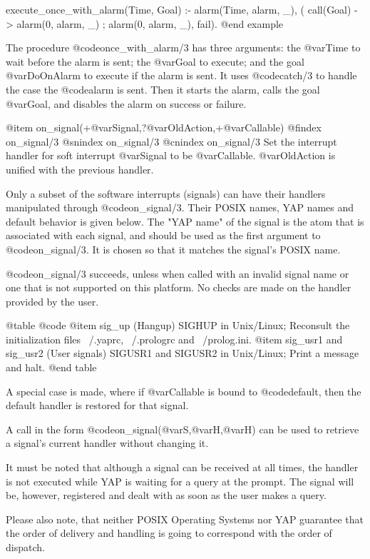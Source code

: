 {{{{{execute_once_with_alarm(Time, Goal) :-
        alarm(Time, alarm, _),
        ( call(Goal) -> alarm(0, alarm, _) ; alarm(0, alarm, _), fail).
@end example

The procedure @code{once_with_alarm/3} has three arguments:
the @var{Time} to wait before the alarm is
sent; the @var{Goal} to execute; and the goal @var{DoOnAlarm} to execute
if the alarm is sent. It uses @code{catch/3} to handle the case the
@code{alarm} is sent. Then it starts the alarm, calls the goal
@var{Goal}, and disables the alarm on success or failure.

@item on_signal(+@var{Signal},?@var{OldAction},+@var{Callable})
@findex on_signal/3
@snindex on_signal/3
@cnindex on_signal/3
Set the interrupt handler for soft interrupt @var{Signal} to be
@var{Callable}. @var{OldAction} is unified with the previous handler.

Only a subset of the software interrupts (signals) can have their
handlers manipulated through @code{on_signal/3}.
Their POSIX names, YAP names and default behavior is given below.
The "YAP name" of the signal is the atom that is associated with
each signal, and should be used as the first argument to
@code{on_signal/3}. It is chosen so that it matches the signal's POSIX
name.

@code{on_signal/3} succeeds, unless when called with an invalid
signal name or one that is not supported on this platform. No checks
are made on the handler provided by the user.

@table @code
@item sig_up (Hangup)
  SIGHUP in Unix/Linux; Reconsult the initialization files
  ~/.yaprc, ~/.prologrc and ~/prolog.ini.
@item sig_usr1 and sig_usr2 (User signals)
  SIGUSR1 and SIGUSR2 in Unix/Linux; Print a message and halt.
@end table

A special case is made, where if @var{Callable} is bound to
@code{default}, then the default handler is restored for that signal.

A call in the form @code{on_signal(@var{S},@var{H},@var{H})} can be used
to retrieve a signal's current handler without changing it.

It must be noted that although a signal can be received at all times,
the handler is not executed while YAP is waiting for a query at the
prompt. The signal will be, however, registered and dealt with as soon
as the user makes a query.

Please also note, that neither POSIX Operating Systems nor YAP guarantee
that the order of delivery and handling is going to correspond with the
order of dispatch.

}}}}}
